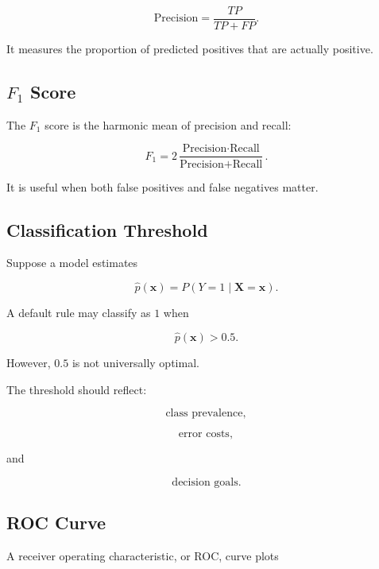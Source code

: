 \[
\boxed{
\text{Precision}
=
\frac{
TP
}{
TP+FP
}.
}
\]

It measures the proportion of predicted positives that are actually
positive.

\subsection{\(F_1\) Score}
\label{subsec:f1-score}

The \(F_1\) score is the harmonic mean of precision and recall:

\[
\boxed{
F_1
=
2
\frac{
\text{Precision}
\cdot
\text{Recall}
}{
\text{Precision}
+
\text{Recall}
}.
}
\]

It is useful when both false positives and false negatives matter.

\subsection{Classification Threshold}
\label{subsec:classification-threshold}

Suppose a model estimates

\[
\widehat{p}(\mathbf{x})
=
P
(
Y=1
\mid
\mathbf{X}=\mathbf{x}
).
\]

A default rule may classify as \(1\) when

\[
\widehat{p}(\mathbf{x})>0.5.
\]

However, \(0.5\) is not universally optimal.

The threshold should reflect:

\[
\boxed{
\text{class prevalence},
}
\]

\[
\boxed{
\text{error costs},
}
\]

and

\[
\boxed{
\text{decision goals}.
}
\]

\subsection{ROC Curve}
\label{subsec:roc-curve}

A receiver operating characteristic, or ROC, curve plots

